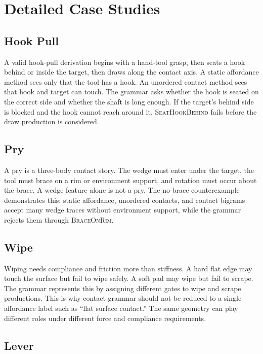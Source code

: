 \documentclass{article}
\begin{document}
\section{Detailed Case Studies}

\subsection{Hook Pull}

A valid hook-pull derivation begins with a hand-tool grasp, then seats a hook behind or inside the target, then draws along the contact axis. A static affordance method sees only that the tool has a hook. An unordered contact method sees that hook and target can touch. The grammar asks whether the hook is seated on the correct side and whether the shaft is long enough. If the target's behind side is blocked and the hook cannot reach around it, \textsc{SeatHookBehind} fails before the draw production is considered.

\subsection{Pry}

A pry is a three-body contact story. The wedge must enter under the target, the tool must brace on a rim or environment support, and rotation must occur about the brace. A wedge feature alone is not a pry. The no-brace counterexample demonstrates this: static affordance, unordered contacts, and contact bigrams accept many wedge traces without environment support, while the grammar rejects them through \textsc{BraceOnRim}.

\subsection{Wipe}

Wiping needs compliance and friction more than stiffness. A hard flat edge may touch the surface but fail to wipe safely. A soft pad may wipe but fail to scrape. The grammar represents this by assigning different gates to wipe and scrape productions. This is why contact grammar should not be reduced to a single affordance label such as ``flat surface contact.'' The same geometry can play different roles under different force and compliance requirements.

\subsection{Lever}
\end{document}
